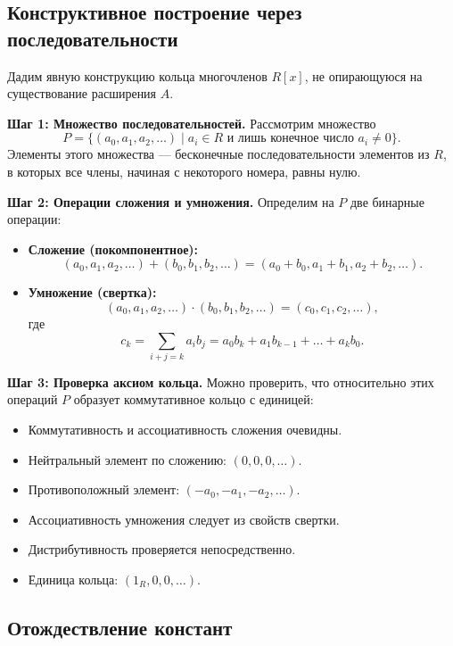 \documentclass[a4paper,12pt]{article}
\theoremstyle{definition}
\theoremstyle{plain}
\theoremstyle{remark}
\begin{document}
	\subsection{Конструктивное построение через последовательности}
	
	Дадим явную конструкцию кольца многочленов \( R[x] \), не опирающуюся на существование расширения \( A \).
	
	\medskip
	\noindent \textbf{Шаг 1: Множество последовательностей.}
	Рассмотрим множество
	\[
	P = \{ (a_0, a_1, a_2, \dots) \mid a_i \in R \text{ и лишь конечное число } a_i \neq 0 \}.
	\]
	Элементы этого множества — бесконечные последовательности элементов из \( R \), в которых все члены, начиная с некоторого номера, равны нулю.
	
	\medskip
	\noindent \textbf{Шаг 2: Операции сложения и умножения.}
	Определим на \( P \) две бинарные операции:
	
	\begin{itemize}
		\item \textbf{Сложение (покомпонентное):}
		\[
		(a_0, a_1, a_2, \dots) + (b_0, b_1, b_2, \dots) = (a_0 + b_0, a_1 + b_1, a_2 + b_2, \dots).
		\]
		
		\item \textbf{Умножение (свертка):}
		\[
		(a_0, a_1, a_2, \dots) \cdot (b_0, b_1, b_2, \dots) = (c_0, c_1, c_2, \dots),
		\]
		где 
		\[
		c_k = \sum_{i+j = k} a_i b_j = a_0 b_k + a_1 b_{k-1} + \dots + a_k b_0.
		\]
	\end{itemize}
	
	\medskip
	\noindent \textbf{Шаг 3: Проверка аксиом кольца.}
	Можно проверить, что относительно этих операций \( P \) образует коммутативное кольцо с единицей:
	\begin{itemize}
		\item Коммутативность и ассоциативность сложения очевидны.
		\item Нейтральный элемент по сложению: \( (0, 0, 0, \dots) \).
		\item Противоположный элемент: \( (-a_0, -a_1, -a_2, \dots) \).
		\item Ассоциативность умножения следует из свойств свертки.
		\item Дистрибутивность проверяется непосредственно.
		\item Единица кольца: \( (1_R, 0, 0, \dots) \).
	\end{itemize}
	
	\subsection{Отождествление констант}
	
\end{document}
